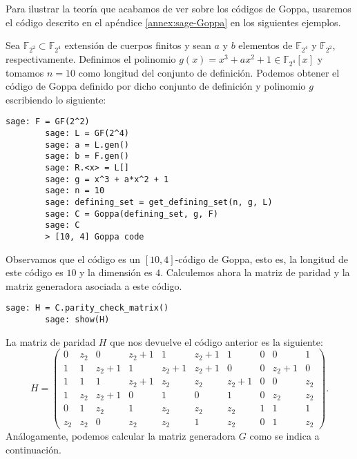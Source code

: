 Para ilustrar la teoría que acabamos de ver sobre los códigos de Goppa, usaremos el código descrito en el apéndice \ref{annex:sage-Goppa} en los siguientes ejemplos.

\begin{exampleth}
    Sea $\mathbb{F}_{2^2} \subset \mathbb{F}_{2^4}$ extensión de cuerpos finitos y sean $a$ y $b$ elementos de $\mathbb{F}_{2^4}$ y $\mathbb{F}_{2^2}$, respectivamente. Definimos el polinomio $g(x) = x^3 + ax^2 + 1 \in \mathbb{F}_{2^4}[x]$ y tomamos $n = 10$ como longitud del conjunto de definición. Podemos obtener el código de Goppa definido por dicho conjunto de definición y polinomio $g$ escribiendo lo siguiente:

    \begin{lstlisting}[gobble=4]
        sage: F = GF(2^2)
        sage: L = GF(2^4)
        sage: a = L.gen()
        sage: b = F.gen()
        sage: R.<x> = L[]
        sage: g = x^3 + a*x^2 + 1
        sage: n = 10
        sage: defining_set = get_defining_set(n, g, L)
        sage: C = Goppa(defining_set, g, F)
        sage: C
        > [10, 4] Goppa code
    \end{lstlisting}

    Observamos que el código es un $[10, 4]$-código de Goppa, esto es, la longitud de este código es $10$ y la dimensión es $4$. Calculemos ahora la matriz de paridad y la matriz generadora asociada a este código.

    \begin{lstlisting}[gobble=4]
        sage: H = C.parity_check_matrix()
        sage: show(H)
    \end{lstlisting}

    La matriz de paridad $H$ que nos devuelve el código anterior es la siguiente:
    \[
        H = \left(\begin{array}{rrrrrrrrrr}
            0 & z_{2} & 0 & z_{2} + 1 & 1 & z_{2} + 1 & 1 & 0 & 0 & 1 \\
            1 & 1 & z_{2} + 1 & 1 & z_{2} + 1 & z_{2} + 1 & 0 & 0 & z_{2} + 1 & 0 \\
            1 & 1 & 1 & z_{2} + 1 & z_{2} & z_{2} & z_{2} + 1 & 0 & 0 & z_{2} \\
            1 & z_{2} & z_{2} + 1 & 0 & 1 & 0 & 1 & 0 & z_{2} & z_{2} \\
            0 & 1 & z_{2} & 1 & z_{2} & z_{2} & z_{2} & 1 & 1 & 1 \\
            z_{2} & z_{2} & 0 & z_{2} & z_{2} & 1 & z_{2} & 0 & 1 & z_{2}
            \end{array}
        \right).
    \]
    Análogamente, podemos calcular la matriz generadora $G$ como se indica a continuación.


\end{exampleth}
